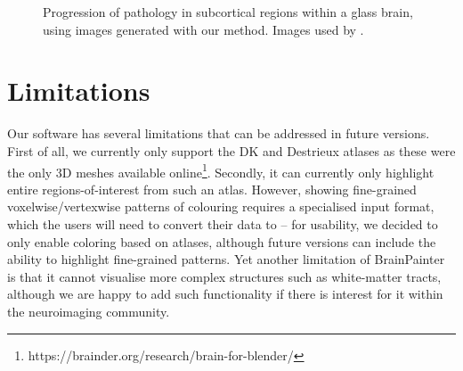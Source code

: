 \documentclass{llncs}
\begin{document}
\begin{figure}[htp]
\centering

 \caption{Progression of pathology in subcortical regions within a glass brain, using images generated with our method. Images used by \cite{wijeratne2018image}.}
   \label{fig:peter}
\end{figure}

\section{Limitations}

Our software has several limitations that can be addressed in future versions. First of all, we currently only support the DK and Destrieux atlases as these were the only 3D meshes available online\footnote{https://brainder.org/research/brain-for-blender/}. Secondly, it can currently only highlight entire regions-of-interest from such an atlas. However, showing fine-grained voxelwise/vertexwise patterns of colouring requires a specialised input format, which the users will need to convert their data to -- for usability, we decided to only enable coloring based on atlases, although future versions can include the ability to highlight fine-grained patterns. Yet another limitation of BrainPainter is that it cannot visualise more complex structures such as white-matter tracts, although we are happy to add such functionality if there is interest for it within the neuroimaging community.
\end{document}
